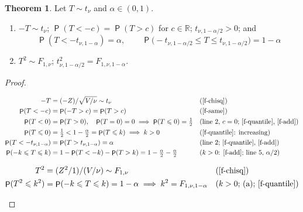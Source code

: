 \documentclass[12pt]{article}
\newcommand{\R}{\mathbb R}
\DeclareMathOperator\prb{\mathsf{P}}
\theoremstyle{definition}
\newtheorem{theorem}{Theorem}
\newcommand{\boardtop}{\vspace*{-\abovedisplayskip}}
\begin{document}
\begin{theorem}\label{h-thm-t}
Let \(T\sim t_\nu\) and \(\alpha\in(0,1)\).
\begin{enumerate}
\item \(-T\sim t_\nu\); \(\prb(T<-c)=\prb(T>c)\) for \(c\in\R\); \(t_{\nu,1-\alpha/2}>0\); and
\[
\prb(T<-t_{\nu,1-\alpha})=\alpha,\qquad\prb\bigl(-t_{\nu,1-\alpha/2}\leqslant T\leqslant t_{\nu,1-\alpha/2}\bigr)=1-\alpha
\]
\item \(T^2\sim F_{1,\nu}\); \(t_{\nu,1-\alpha/2}^2=F_{1,\nu,1-\alpha}\).
\end{enumerate}
\end{theorem}
\begin{proof}
\begin{board}[(a) \(T=Z/\sqrt{V/\nu}\), \(Z\sim N(0,1)\), \(V\sim\chi^2_\nu\) independent (\ref{f-chisq}); \(-Z\sim N(0,1)\)
(Theorem~\ref{h-thm-linear}, \(A=-1\)), independent of \(V\) (\ref{f-indep}); \(k=t_{\nu,1-\alpha/2}\):]
\boardtop
\begin{align*}
-T&=(-Z)/\sqrt{V/\nu}\sim t_\nu&&\text{(\ref{f-chisq})}\\
\prb(T<-c)&=\prb(-T>c)=\prb(T>c)&&\text{(\ref{f-same})}\\
\prb(T<0)&=\prb(T>0),\quad\prb(T=0)=0\implies\prb(T\leqslant0)=\tfrac12&&\text{(line 2, \(c=0\); \ref{f-quantile}, \ref{f-add})}\\
\prb(T\leqslant0)&=\tfrac12<1-\tfrac\alpha2=\prb(T\leqslant k)\implies k>0&&\text{(\ref{f-quantile}: increasing)}\\
\prb(T<-t_{\nu,1-\alpha})&=\prb(T>t_{\nu,1-\alpha})=\alpha&&\text{(line 2; \ref{f-quantile}, \ref{f-add})}\\
\prb(-k\leqslant T\leqslant k)&=1-\prb(T<-k)-\prb(T>k)=1-\tfrac\alpha2-\tfrac\alpha2&&\text{(\(k>0\): \ref{f-add}; line 5, \(\alpha/2\))}
\end{align*}
\end{board}
\begin{board}[(b) \(Z^2\sim\chi^2_1\) (\ref{f-chisq}), independent of \(V\) (\ref{f-indep}); \(k=t_{\nu,1-\alpha/2}>0\) ((a)):]
\boardtop
\begin{align*}
T^2&=(Z^2/1)/(V/\nu)\sim F_{1,\nu}&&\text{(\ref{f-chisq})}\\
\prb(T^2\leqslant k^2)&=\prb(-k\leqslant T\leqslant k)=1-\alpha\implies k^2=F_{1,\nu,1-\alpha}&&\text{(\(k>0\); (a); \ref{f-quantile})}
\end{align*}
\end{board}
\nopagebreak
\end{proof}
\end{document}
